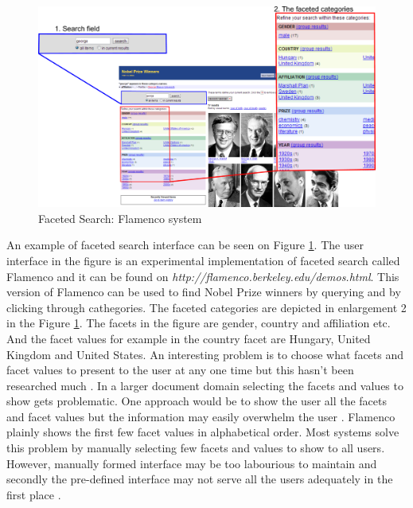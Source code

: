 \documentclass{sigchi}
\begin{document}
\begin{figure}[ht!] %
\caption{ Faceted Search: Flamenco system} \label{flamenco}
\centering
\vspace{5pt}
\includegraphics[scale=0.28]{figures/flamenco.pdf} 
\end{figure}

An example of faceted search interface can be seen on Figure \ref{flamenco}. The user interface in the figure is an experimental implementation of faceted search called Flamenco and it can be found on \textit{http://flamenco.berkeley.edu/demos.html}. This version of Flamenco can be used to find Nobel Prize winners by querying and by clicking through cathegories. The faceted categories are depicted in enlargement 2 in the Figure \ref{flamenco}. The facets in the figure are gender, country and affiliation etc. And the facet values for example in the country facet are Hungary, United Kingdom and United States. An interesting problem is to choose what facets and facet values to present to the user at any one time but this hasn't been researched much \cite{koren08}. In a larger document domain selecting the facets and values to show gets problematic. One approach would be to show the user all the facets and facet values but the information may easily overwhelm the user \cite{koren08}. Flamenco plainly shows the first few facet values in alphabetical order. Most systems solve this problem by manually selecting few facets and values to show to all users. However, manually formed interface may be too labourious to maintain and secondly the pre-defined interface may not serve all the users adequately in the first place \cite{koren08}.  
\end{document}
